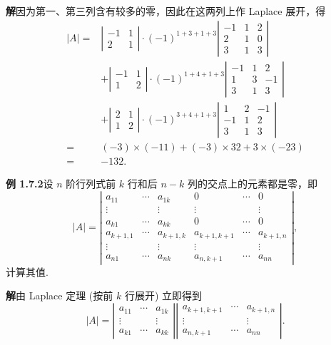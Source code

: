 \documentclass[UTF8, 12pt, fontset=fandol, oneside]{ctexart}
\begin{document}
\noindent\textbf{解}\quad 因为第一、第三列含有较多的零，因此在这两列上作 Laplace 展开，得
\[
\begin{aligned}
|A|={}&
\left|\begin{array}{rr}-1&1\\2&1\end{array}\right|
\cdot(-1)^{1+3+1+3}
\left|\begin{array}{rrr}-1&1&2\\2&1&0\\3&1&3\end{array}\right|\\
&+
\left|\begin{array}{rr}-1&1\\1&2\end{array}\right|
\cdot(-1)^{1+4+1+3}
\left|\begin{array}{rrr}-1&1&2\\1&3&-1\\3&1&3\end{array}\right|\\
&+
\left|\begin{array}{rr}2&1\\1&2\end{array}\right|
\cdot(-1)^{3+4+1+3}
\left|\begin{array}{rrr}1&2&-1\\-1&1&2\\3&1&3\end{array}\right|\\
= {}& (-3)\times(-11)+(-3)\times32+3\times(-23)\\
= {}& -132.
\end{aligned}
\]

\noindent\textbf{例 1.7.2}\quad 设 $n$ 阶行列式前 $k$ 行和后 $n-k$ 列的交点上的元素都是零，即
\[
|A|=
\left|\begin{array}{cccccc}
a_{11}&\cdots&a_{1k}&0&\cdots&0\\
\vdots&&\vdots&\vdots&&\vdots\\
a_{k1}&\cdots&a_{kk}&0&\cdots&0\\
a_{k+1,1}&\cdots&a_{k+1,k}&a_{k+1,k+1}&\cdots&a_{k+1,n}\\
\vdots&&\vdots&\vdots&&\vdots\\
a_{n1}&\cdots&a_{nk}&a_{n,k+1}&\cdots&a_{nn}
\end{array}\right|,
\]
计算其值.

\noindent\textbf{解}\quad 由 Laplace 定理 (按前 $k$ 行展开) 立即得到
\[
|A|=
\left|\begin{array}{ccc}
a_{11}&\cdots&a_{1k}\\
\vdots&&\vdots\\
a_{k1}&\cdots&a_{kk}
\end{array}\right|
\left|\begin{array}{ccc}
a_{k+1,k+1}&\cdots&a_{k+1,n}\\
\vdots&&\vdots\\
a_{n,k+1}&\cdots&a_{nn}
\end{array}\right|.
\]
\end{document}
